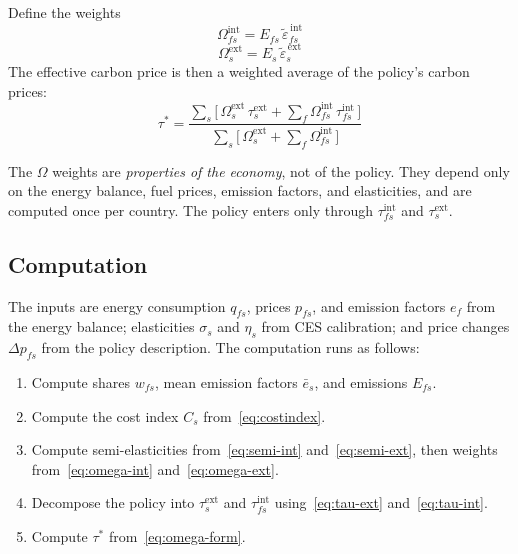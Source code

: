\documentclass[11pt,a4paper]{article}
\begin{document}
Define the weights
\begin{equation}\label{eq:omega-int}
\Omega^{\mathrm{int}}_{fs} = E_{fs}\,\tilde{\varepsilon}^{\,\mathrm{int}}_{fs}
\end{equation}
\begin{equation}\label{eq:omega-ext}
\Omega^{\mathrm{ext}}_{s} = E_{s}\,\tilde{\varepsilon}^{\,\mathrm{ext}}_{s}
\end{equation}
The effective carbon price is then a weighted average of the policy's carbon prices:
\begin{equation}\label{eq:omega-form}
\tau^{*} = \frac{\sum_s \big[\,\Omega^{\mathrm{ext}}_s\,\tau^{\mathrm{ext}}_s + \sum_f \Omega^{\mathrm{int}}_{fs}\,\tau^{\mathrm{int}}_{fs}\,\big]}{\sum_s \big[\,\Omega^{\mathrm{ext}}_s + \sum_f \Omega^{\mathrm{int}}_{fs}\,\big]}
\end{equation}

The $\Omega$ weights are \emph{properties of the economy}, not of the policy. They depend only on the energy balance, fuel prices, emission factors, and elasticities, and are computed once per country. The policy enters only through $\tau^{\mathrm{int}}_{fs}$ and $\tau^{\mathrm{ext}}_s$.

\subsection{Computation}

The inputs are energy consumption $q_{fs}$, prices $p_{fs}$, and emission factors $e_f$ from the energy balance; elasticities $\sigma_s$ and $\eta_s$ from CES calibration; and price changes $\Delta p_{fs}$ from the policy description. The computation runs as follows:
\begin{enumerate}[nosep]
\item Compute shares $w_{fs}$, mean emission factors $\bar{e}_s$, and emissions $E_{fs}$.
\item Compute the cost index $C_s$ from~\eqref{eq:costindex}.
\item Compute semi-elasticities from~\eqref{eq:semi-int} and~\eqref{eq:semi-ext}, then weights from~\eqref{eq:omega-int} and~\eqref{eq:omega-ext}.
\item Decompose the policy into $\tau^{\mathrm{ext}}_s$ and $\tau^{\mathrm{int}}_{fs}$ using~\eqref{eq:tau-ext} and~\eqref{eq:tau-int}.
\item Compute $\tau^*$ from~\eqref{eq:omega-form}.
\end{enumerate}

\newpage
\end{document}

